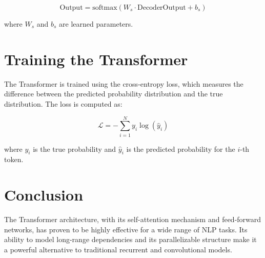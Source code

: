 \begin{equation}
\text{Output} = \text{softmax}(W_s \cdot \text{DecoderOutput} + b_s)
\end{equation}

where \( W_s \) and \( b_s \) are learned parameters.

\section{Training the Transformer}

The Transformer is trained using the cross-entropy loss, which measures the difference between the predicted probability distribution and the true distribution. The loss is computed as:

\begin{equation}
\mathcal{L} = -\sum_{i=1}^N y_i \log(\hat{y}_i)
\end{equation}

where \( y_i \) is the true probability and \( \hat{y}_i \) is the predicted probability for the \( i \)-th token.

\section{Conclusion}

The Transformer architecture, with its self-attention mechanism and feed-forward networks, has proven to be highly effective for a wide range of NLP tasks. Its ability to model long-range dependencies and its parallelizable structure make it a powerful alternative to traditional recurrent and convolutional models.



